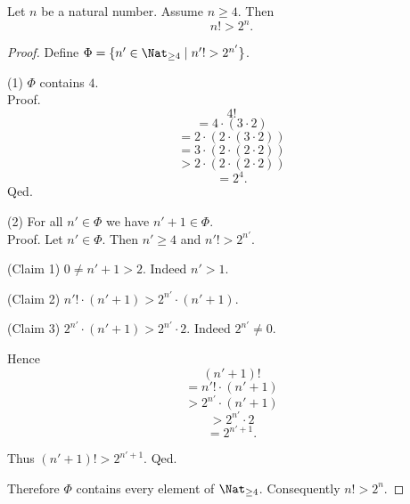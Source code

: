 \begin{forthel}
  \begin{proposition}
    Let $n$ be a natural number.
    Assume $n \geq 4$.
    Then \[ n! > 2^{n}. \]
  \end{proposition}
  \begin{proof}
    Define $\Phi = \{ n' \in \Nat_{\geq 4} \mid n'! > 2^{n'} \}$.

    (1) $\Phi$ contains $4$. \\
    Proof.
      \[  4!                                  \]
      \[    = 4 \cdot (3 \cdot 2)             \]
      \[    = 2 \cdot (2 \cdot (3 \cdot 2))   \]
      \[    = 3 \cdot (2 \cdot (2 \cdot 2))   \]
      \[    > 2 \cdot (2 \cdot (2 \cdot 2))   \]
      \[    = 2^{4}.                          \]
    Qed.

    (2) For all $n' \in \Phi$ we have $n' + 1 \in \Phi$. \\
    Proof.
      Let $n' \in \Phi$.
      Then $n' \geq 4$ and $n'! > 2^{n'}$.

      (Claim 1) $0 \neq n' + 1 > 2$.
      Indeed $n' > 1$.

      (Claim 2) $n'! \cdot (n' + 1) > 2^{n'} \cdot (n' + 1)$.

      (Claim 3) $2^{n'} \cdot (n' + 1) > 2^{n'} \cdot 2$.
      Indeed $2^{n'} \neq 0$.

      Hence
      \[  (n' + 1)!                   \]
      \[    = n'! \cdot (n' + 1)      \]
      \[    > 2^{n'} \cdot (n' + 1)   \]
      \[    > 2^{n'} \cdot 2          \]
      \[    = 2^{n' + 1}.             \]

      Thus $(n' + 1)! > 2^{n' + 1}$.
    Qed.

    Therefore $\Phi$ contains every element of $\Nat_{\geq 4}$.
    Consequently $n! > 2^{n}$.
  \end{proof}
\end{forthel}
